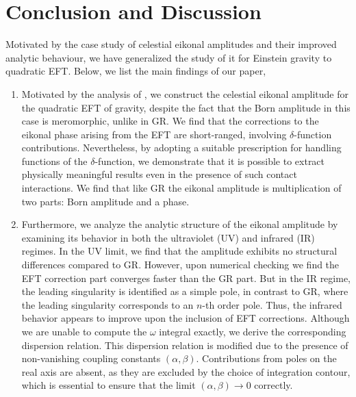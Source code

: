 \section{Conclusion and Discussion}\label{ch5:sec7}
Motivated by the case study of celestial eikonal amplitudes and their improved analytic behaviour, we have generalized the study of it for Einstein gravity to quadratic EFT. Below, we list the main findings of our paper,
\begin{enumerate}
\item Motivated by the analysis of \cite{Adamo:2024mqn}, we construct the celestial eikonal amplitude for the quadratic EFT of gravity, despite the fact that the Born amplitude in this case is meromorphic, unlike in GR. We find that the corrections to the eikonal phase arising from the EFT are short-ranged, involving \(\delta\)-function contributions. Nevertheless, by adopting a suitable prescription for handling functions of the \(\delta\)-function, we demonstrate that it is possible to extract physically meaningful results even in the presence of such contact interactions. We find that like GR the eikonal amplitude is multiplication of two parts: Born amplitude and a phase.
\item Furthermore, we analyze the analytic structure of the eikonal amplitude by examining its behavior in both the ultraviolet (UV) and infrared (IR) regimes. In the UV limit, we find that the amplitude exhibits no structural differences compared to GR. However, upon numerical checking we find the EFT correction part converges faster than the GR part. But in the IR regime, the leading singularity is identified as a simple pole, in contrast to GR, where the leading singularity corresponds to an \(n\)-th order pole. Thus, the infrared behavior appears to improve upon the inclusion of EFT corrections. Although we are unable to compute the \(\omega\) integral exactly, we derive the corresponding dispersion relation. This dispersion relation is modified due to the presence of non-vanishing coupling constants \((\alpha, \beta)\). Contributions from poles on the real axis are absent, as they are excluded by the choice of integration contour, which is essential to ensure that the limit \((\alpha, \beta) \to 0\) correctly.


\end{enumerate}

